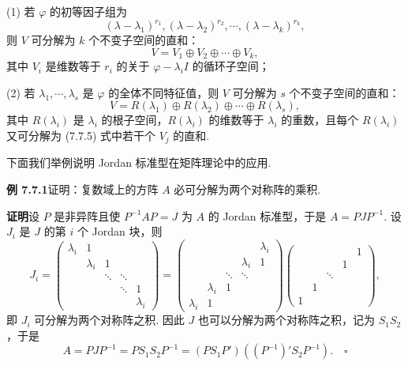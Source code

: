 \documentclass[UTF8, 12pt, fontset=fandol, oneside]{ctexart}
\begin{document}
(1) 若 $\varphi$ 的初等因子组为
\[
(\lambda-\lambda_1)^{r_1},(\lambda-\lambda_2)^{r_2},\cdots,(\lambda-\lambda_k)^{r_k},
\]
则 $V$ 可分解为 $k$ 个不变子空间的直和：
\begin{equation}
V=V_1\oplus V_2\oplus\cdots\oplus V_k,
\tag{7.7.5}
\end{equation}
其中 $V_i$ 是维数等于 $r_i$ 的关于 $\varphi-\lambda_iI$ 的循环子空间；

(2) 若 $\lambda_1,\cdots,\lambda_s$ 是 $\varphi$ 的全体不同特征值，则 $V$ 可分解为 $s$ 个不变子空间的直和：
\begin{equation}
V=R(\lambda_1)\oplus R(\lambda_2)\oplus\cdots\oplus R(\lambda_s),
\tag{7.7.6}
\end{equation}
其中 $R(\lambda_i)$ 是 $\lambda_i$ 的根子空间，$R(\lambda_i)$ 的维数等于 $\lambda_i$ 的重数，且每个 $R(\lambda_i)$ 又可分解为 (7.7.5) 式中若干个 $V_j$ 的直和.

下面我们举例说明 Jordan 标准型在矩阵理论中的应用.

\noindent\textbf{例 7.7.1}\quad 证明：复数域上的方阵 $A$ 必可分解为两个对称阵的乘积.

\noindent\textbf{证明}\quad 设 $P$ 是非异阵且使 $P^{-1}AP=J$ 为 $A$ 的 Jordan 标准型，于是 $A=PJP^{-1}$. 设 $J_i$ 是 $J$ 的第 $i$ 个 Jordan 块，则
\[
J_i=\left(\begin{array}{ccccc}
\lambda_i & 1 & & & \\
& \lambda_i & 1 & & \\
& & \ddots & \ddots & \\
& & & \ddots & 1\\
& & & & \lambda_i
\end{array}\right)
=\left(\begin{array}{ccccc}
& & & & \lambda_i\\
& & & \lambda_i & 1\\
& & \ddots & \ddots & \\
& \lambda_i & 1 & & \\
\lambda_i & 1 & & &
\end{array}\right)
\left(\begin{array}{ccccc}
& & & & 1\\
& & & 1 & \\
& & \ddots & & \\
& 1 & & & \\
1 & & & &
\end{array}\right),
\]
即 $J_i$ 可分解为两个对称阵之积. 因此 $J$ 也可以分解为两个对称阵之积，记为 $S_1S_2$，于是
\[
A=PJP^{-1}=PS_1S_2P^{-1}=(PS_1P')((P^{-1})'S_2P^{-1}).\quad \square
\]
\end{document}
